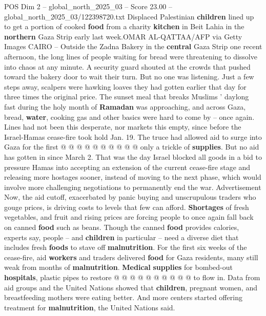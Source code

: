 \begin{textsample}{POS Dim 2 – global\_north\_2025\_03 – Score 23.00 – global\_north\_2025\_03/122398720.txt}  \label{ex:f2_pos_410}
Displaced Palestinian \textbf{children} lined up to get a portion of cooked \textbf{food} from a charity \textbf{kitchen} in Beit Lahia in the \textbf{northern} Gaza Strip early last week.OMAR AL-QATTAA/AFP via Getty Images CAIRO -- Outside the Zadna Bakery in the \textbf{central} Gaza Strip one recent afternoon, the long lines of people waiting for bread were threatening to dissolve into chaos at any minute.
A security guard shouted at the crowds that pushed toward the bakery door to wait their turn.
But no one was listening.
Just a few steps away, scalpers were hawking loaves they had gotten earlier that day for three times the original price.
The sunset meal that breaks Muslims ' daylong fast during the holy month of \textbf{Ramadan} was approaching, and across Gaza, bread, \textbf{water}, cooking gas and other basics were hard to come by -- once again.
Lines had not been this desperate, nor markets this empty, since before the Israel-Hamas cease-fire took hold Jan. 19.
The truce had allowed aid to surge into Gaza for the first @ @ @ @ @ @ @ @ @ @ only a trickle of \textbf{supplies}.
But no aid has gotten in since March 2.
That was the day Israel blocked all goods in a bid to pressure Hamas into accepting an extension of the current cease-fire stage and releasing more hostages sooner, instead of moving to the next phase, which would involve more challenging negotiations to permanently end the war.
Advertisement Now, the aid cutoff, exacerbated by panic buying and unscrupulous traders who gouge prices, is driving costs to levels that few can afford. \textbf{Shortages} of fresh vegetables, and fruit and rising prices are forcing people to once again fall back on canned \textbf{food} such as beans.
Though the canned \textbf{food} provides calories, experts say, people -- and \textbf{children} in particular -- need a diverse diet that includes fresh \textbf{foods} to stave off \textbf{malnutrition}.
For the first six weeks of the cease-fire, aid \textbf{workers} and traders delivered \textbf{food} for Gaza residents, many still weak from months of \textbf{malnutrition}. \textbf{Medical} \textbf{supplies} for bombed-out \textbf{hospitals}, plastic pipes to restore @ @ @ @ @ @ @ @ @ @ to flow in.
Data from aid groups and the United Nations showed that \textbf{children}, pregnant women, and breastfeeding mothers were eating better.
And more centers started offering treatment for \textbf{malnutrition}, the United Nations said.

\end{textsample}
